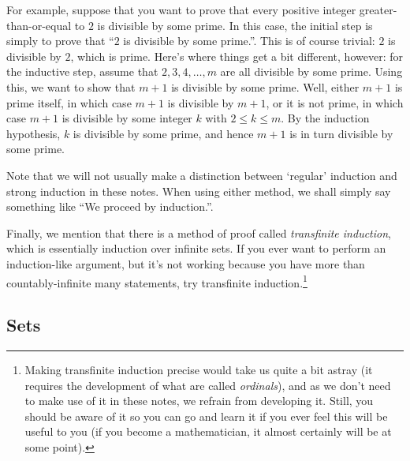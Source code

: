 For example, suppose that you want to prove that every positive integer greater-than-or-equal to $2$ is divisible by some prime.  In this case, the initial step is simply to prove that ``$2$ is divisible by some prime.''.  This is of course trivial:  $2$ is divisible by $2$, which is prime.  Here's where things get a bit different, however:  for the inductive step, assume that $2,3,4,\ldots ,m$ are all divisible by some prime.  Using this, we want to show that $m+1$ is divisible by some prime.  Well, either $m+1$ is prime itself, in which case $m+1$ is divisible by $m+1$, or it is not prime, in which case $m+1$ is divisible by some integer $k$ with $2\leq k\leq m$.  By the induction hypothesis, $k$ is divisible by some prime, and hence $m+1$ is in turn divisible by some prime.

Note that we will not usually make a distinction between `regular' induction and strong induction in these notes.  When using either method, we shall simply say something like ``We proceed by induction.''.

Finally, we mention that there is a method of proof called \emph{transfinite induction}, which is essentially induction over infinite sets.  If you ever want to perform an induction-like argument, but it's not working because you have more than countably-infinite many statements, try transfinite induction.\footnote{Making transfinite induction precise would take us quite a bit astray (it requires the development of what are called \emph{ordinals}), and as we don't need to make use of it in these notes, we refrain from developing it.  Still, you should be aware of it so you can go and learn it if you ever feel this will be useful to you (if you become a mathematician, it almost certainly will be at some point).}

\subsection{Sets}\label{sbsSets}

